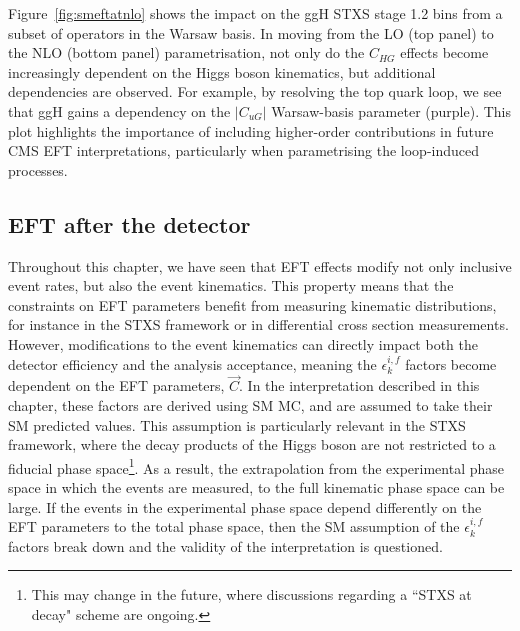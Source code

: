 Figure~\ref{fig:smeftatnlo} shows the impact on the ggH STXS stage 1.2 bins from a subset of operators in the Warsaw basis. In moving from the LO (top panel) to the NLO (bottom panel) parametrisation, not only do the $C_{HG}$ effects become increasingly dependent on the Higgs boson kinematics, but additional dependencies are observed. For example, by resolving the top quark loop, we see that ggH gains a dependency on the $|C_{uG}|$ Warsaw-basis parameter (purple). This plot highlights the importance of including higher-order contributions in future CMS EFT interpretations, particularly when parametrising the loop-induced processes.

\subsection{EFT after the detector}\label{sec:eft_acceptance_corrections}
Throughout this chapter, we have seen that EFT effects modify not only inclusive event rates, but also the event kinematics. This property means that the constraints on EFT parameters benefit from measuring kinematic distributions, for instance in the STXS framework or in differential cross section measurements. However, modifications to the event kinematics can directly impact both the detector efficiency and the analysis acceptance, meaning the $\epsilon^{i,f}_k$ factors become dependent on the EFT parameters, $\vec{C}$. In the interpretation described in this chapter, these factors are derived using SM MC, and are assumed to take their SM predicted values. This assumption is particularly relevant in the STXS framework, where the decay products of the Higgs boson are not restricted to a fiducial phase space\footnote{This may change in the future, where discussions regarding a ``STXS at decay" scheme are ongoing.}. As a result, the extrapolation from the experimental phase space in which the events are measured, to the full kinematic phase space can be large. If the events in the experimental phase space depend differently on the EFT parameters to the total phase space, then the SM assumption of the $\epsilon^{i,f}_k$ factors break down and the validity of the interpretation is questioned. 

